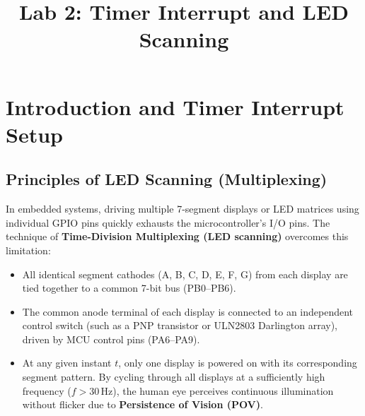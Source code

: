 \documentclass{hcmut-report}
\title{Lab 2: Timer Interrupt and LED Scanning}
\begin{document}
\coverpage

\tableofcontents
\newpage

\section{Introduction and Timer Interrupt Setup}

\subsection{Principles of LED Scanning (Multiplexing)}
In embedded systems, driving multiple 7-segment displays or LED matrices using individual GPIO pins quickly exhausts the microcontroller's I/O pins. The technique of \textbf{Time-Division Multiplexing (LED scanning)} overcomes this limitation:
\begin{itemize}
    \item All identical segment cathodes (A, B, C, D, E, F, G) from each display are tied together to a common 7-bit bus (PB0--PB6).
    \item The common anode terminal of each display is connected to an independent control switch (such as a PNP transistor or ULN2803 Darlington array), driven by MCU control pins (PA6--PA9).
    \item At any given instant $t$, only one display is powered on with its corresponding segment pattern. By cycling through all displays at a sufficiently high frequency ($f > 30\,\text{Hz}$), the human eye perceives continuous illumination without flicker due to \textbf{Persistence of Vision (POV)}.
\end{itemize}
\end{document}
